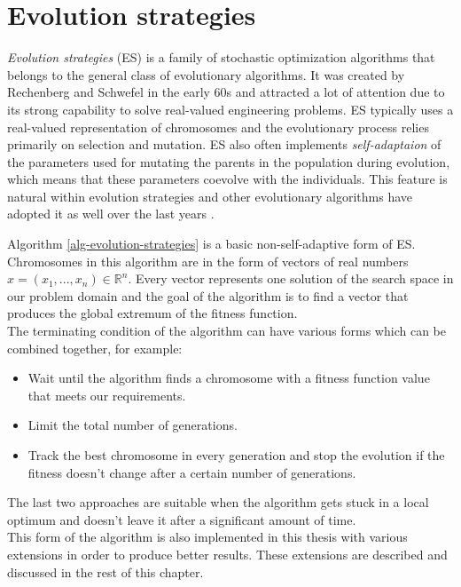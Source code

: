 \section{Evolution strategies} \label{evolution-strategies}
\textit{Evolution strategies} (ES) is a family of stochastic optimization algorithms that belongs to the general class of evolutionary algorithms. It was created by Rechenberg and Schwefel in the early 60s and attracted a lot of attention due to its strong capability to solve real-valued engineering problems. ES typically uses a real-valued representation of chromosomes and the evolutionary process relies primarily on selection and mutation. ES also often implements \textit{self-adaptaion} of the parameters used for mutating the parents in the population during evolution, which means that these parameters coevolve with the individuals. This feature is natural within evolution strategies and other evolutionary algorithms have adopted it as well over the last years \cite{natural-computing-algorithms, introduction-to-evolutionary-computing}.

Algorithm \ref{alg-evolution-strategies} is a basic non-self-adaptive form of ES. Chromosomes in this algorithm are in the form of vectors of real numbers $x = (x_1,...,x_n) \in \mathbb{R}^n$. Every vector represents one solution of the search space in our problem domain and the goal of the algorithm is to find a vector that produces the global extremum of the fitness function.\\
The terminating condition of the algorithm can have various forms which can be combined together, for example:

 \begin{itemize}
    \item Wait until the algorithm finds a chromosome with a fitness function value that meets our requirements.
    \item Limit the total number of generations.
    \item Track the best chromosome in every generation and stop the evolution if the fitness doesn't change after a certain number of generations.
 \end{itemize}

 The last two approaches are suitable when the algorithm gets stuck in a local optimum and doesn't leave it after a significant amount of time.\\
This form of the algorithm is also implemented in this thesis with various extensions in order to produce better results. These extensions are described and discussed in the rest of this chapter.

